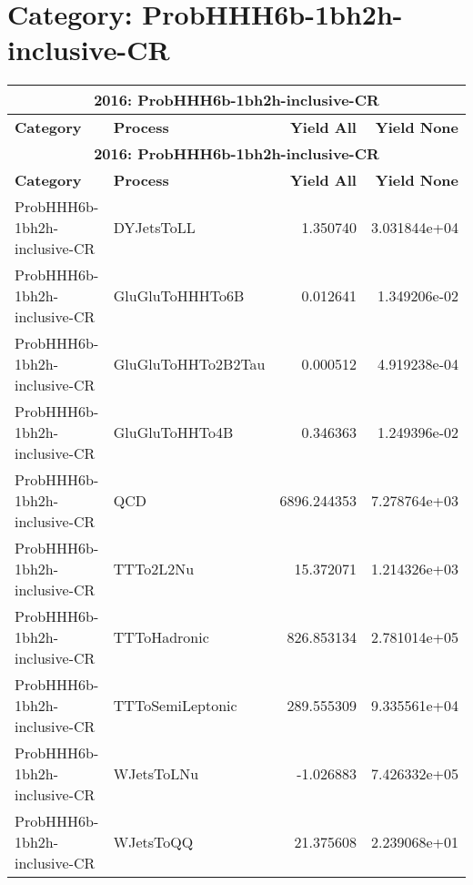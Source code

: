 \documentclass{article}
\begin{document}
\section*{Category: ProbHHH6b-1bh2h-inclusive-CR}
\begin{longtable}[c]{|l|l|r|r|}
\hline
\multicolumn{4}{|c|}{\textbf{2016: ProbHHH6b-1bh2h-inclusive-CR}} \\
\hline
\textbf{Category} & \textbf{Process} & \textbf{Yield All} & \textbf{Yield None} \\
\hline
\endfirsthead
\hline
\multicolumn{4}{|c|}{\textbf{2016: ProbHHH6b-1bh2h-inclusive-CR}} \\
\hline
\textbf{Category} & \textbf{Process} & \textbf{Yield All} & \textbf{Yield None} \\
\hline
\endhead
ProbHHH6b-1bh2h-inclusive-CR & DYJetsToLL & 1.350740 & 3.031844e+04 \\
\hline
ProbHHH6b-1bh2h-inclusive-CR & GluGluToHHHTo6B & 0.012641 & 1.349206e-02 \\
\hline
ProbHHH6b-1bh2h-inclusive-CR & GluGluToHHTo2B2Tau & 0.000512 & 4.919238e-04 \\
\hline
ProbHHH6b-1bh2h-inclusive-CR & GluGluToHHTo4B & 0.346363 & 1.249396e-02 \\
\hline
ProbHHH6b-1bh2h-inclusive-CR & QCD & 6896.244353 & 7.278764e+03 \\
\hline
ProbHHH6b-1bh2h-inclusive-CR & TTTo2L2Nu & 15.372071 & 1.214326e+03 \\
\hline
ProbHHH6b-1bh2h-inclusive-CR & TTToHadronic & 826.853134 & 2.781014e+05 \\
\hline
ProbHHH6b-1bh2h-inclusive-CR & TTToSemiLeptonic & 289.555309 & 9.335561e+04 \\
\hline
ProbHHH6b-1bh2h-inclusive-CR & WJetsToLNu & -1.026883 & 7.426332e+05 \\
\hline
ProbHHH6b-1bh2h-inclusive-CR & WJetsToQQ & 21.375608 & 2.239068e+01 \\
\hline
\end{longtable}
\end{document}
